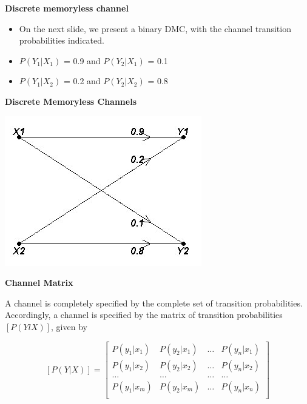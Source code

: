 \documentclass[a4]{beamer}
\begin{document}
\noindent \textbf{Discrete memoryless channel}
\begin{itemize}
\item On the next slide, we present a binary DMC, with the channel transition probabilities indicated.
\item $P(Y_1|X_1)$ = 0.9  and $P(Y_2|X_1)$ = 0.1
\item $P(Y_1|X_2)$ = 0.2  and $P(Y_2|X_2)$ = 0.8
\end{itemize}


{
\noindent \textbf{Discrete Memoryless Channels}

\begin{center}
\includegraphics[scale=0.54]{10Bnet2}
\end{center}

}

%


\noindent \textbf{Channel Matrix}

A channel is completely specified by the complete set of transition probabilities. Accordingly, a
channel is specified by the matrix of transition probabilities $[P(YlX)]$, given by

\[  [P(Y|X)]  = \left[ \begin{array}{cccc}
P(y_1|x_1) & P(y_2|x_1) & \ldots & P(y_n|x_1) \\
P(y_1|x_2) & P(y_2|x_2) & \ldots & P(y_n|x_2) \\
\ldots & \ldots & \ldots & \ldots \\
P(y_1|x_m) & P(y_2|x_m) & \ldots & P(y_n|x_n) \\
\end{array} \right] \]
\end{document}
